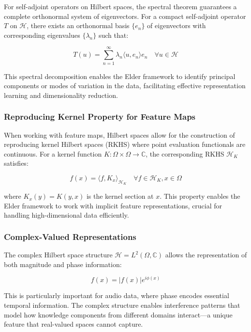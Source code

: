 For self-adjoint operators on Hilbert spaces, the spectral theorem guarantees a complete orthonormal system of eigenvectors. For a compact self-adjoint operator $T$ on $\mathcal{H}$, there exists an orthonormal basis $\{e_n\}$ of eigenvectors with corresponding eigenvalues $\{\lambda_n\}$ such that:

\begin{equation}
T(u) = \sum_{n=1}^{\infty} \lambda_n \langle u, e_n \rangle e_n \quad \forall u \in \mathcal{H}
\end{equation}

This spectral decomposition enables the Elder framework to identify principal components or modes of variation in the data, facilitating effective representation learning and dimensionality reduction.

\subsubsection{Reproducing Kernel Property for Feature Maps}

When working with feature maps, Hilbert spaces allow for the construction of reproducing kernel Hilbert spaces (RKHS) where point evaluation functionals are continuous. For a kernel function $K: \Omega \times \Omega \rightarrow \mathbb{C}$, the corresponding RKHS $\mathcal{H}_K$ satisfies:

\begin{equation}
f(x) = \langle f, K_x \rangle_{\mathcal{H}_K} \quad \forall f \in \mathcal{H}_K, x \in \Omega
\end{equation}

where $K_x(y) = K(y,x)$ is the kernel section at $x$. This property enables the Elder framework to work with implicit feature representations, crucial for handling high-dimensional data efficiently.

\subsubsection{Complex-Valued Representations}

The complex Hilbert space structure $\mathcal{H} = L^2(\Omega, \mathbb{C})$ allows the representation of both magnitude and phase information:

\begin{equation}
f(x) = |f(x)| e^{i\phi(x)}
\end{equation}

This is particularly important for audio data, where phase encodes essential temporal information. The complex structure enables interference patterns that model how knowledge components from different domains interact—a unique feature that real-valued spaces cannot capture.

